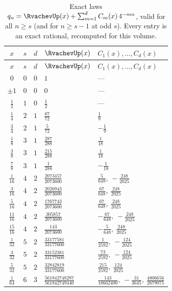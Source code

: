\documentclass[11pt,oneside]{article}
\theoremstyle{plain}
\theoremstyle{definition}
\theoremstyle{remark}
\newcommand{\upn}[1]{\RvachevUp_{#1}}
\newcommand{\Cr}[2]{C_{#1}\!\left(#2\right)}                %
\newcommand{\qn}[1]{q_{#1}}                                 %
\begin{document}
\begin{center}
\small
\begin{longtable}{@{}c c c l l@{}}
\caption{Exact laws $\qn{n}=\RvachevUp(x)+\sum_{m=1}^{d}\Cr{m}{x}4^{-mn}$, valid for all $n\ge s$ (and for $n\ge s-1$ at odd $s$).  Every entry is an exact rational, recomputed for this volume.}
\label{due:tab:exr-laws}\\
\toprule
$x$ & $s$ & $d$ & $\RvachevUp(x)$ & $\Cr{1}{x},\ldots,\Cr{d}{x}$\\
\midrule
\endfirsthead
\toprule
$x$ & $s$ & $d$ & $\RvachevUp(x)$ & $\Cr{1}{x},\ldots,\Cr{d}{x}$\\
\midrule
\endhead
$0$ & $0$ & $0$ & $1$ & ---\\
$\pm1$ & $0$ & $0$ & $0$ & ---\\
$\tfrac12$ & $1$ & $0$ & $\tfrac12$ & ---\\
$\tfrac14$ & $2$ & $1$ & $\tfrac{67}{72}$ & $\tfrac19$\\
$\tfrac34$ & $2$ & $1$ & $\tfrac5{72}$ & $-\tfrac19$\\
$\tfrac18$ & $3$ & $1$ & $\tfrac{287}{288}$ & $\tfrac1{18}$\\
$\tfrac38$ & $3$ & $1$ & $\tfrac{215}{288}$ & $\tfrac1{18}$\\
$\tfrac78$ & $3$ & $1$ & $\tfrac1{288}$ & $-\tfrac1{18}$\\
$\tfrac1{16}$ & $4$ & $2$ & $\tfrac{2073457}{2073600}$ & $\tfrac5{648},\ -\tfrac{248}{2025}$\\
$\tfrac3{16}$ & $4$ & $2$ & $\tfrac{2026943}{2073600}$ & $\tfrac{67}{648},\ \tfrac{248}{2025}$\\
$\tfrac5{16}$ & $4$ & $2$ & $\tfrac{1767743}{2073600}$ & $\tfrac{67}{648},\ \tfrac{248}{2025}$\\
$\tfrac{11}{16}$ & $4$ & $2$ & $\tfrac{305857}{2073600}$ & $-\tfrac{67}{648},\ -\tfrac{248}{2025}$\\
$\tfrac{15}{16}$ & $4$ & $2$ & $\tfrac{143}{2073600}$ & $-\tfrac5{648},\ \tfrac{248}{2025}$\\
$\tfrac1{32}$ & $5$ & $2$ & $\tfrac{33177581}{33177600}$ & $\tfrac1{2592},\ -\tfrac{124}{2025}$\\
$\tfrac3{32}$ & $5$ & $2$ & $\tfrac{33152381}{33177600}$ & $\tfrac{73}{2592},\ -\tfrac{124}{2025}$\\
$\tfrac5{32}$ & $5$ & $2$ & $\tfrac{32842819}{33177600}$ & $\tfrac{215}{2592},\ \tfrac{124}{2025}$\\
$\tfrac1{64}$ & $6$ & $3$ & $\tfrac{561842748287}{561842749440}$ & $\tfrac{143}{18662400},\ -\tfrac{31}{3645},\ \tfrac{4806656}{2679075}$\\

\end{longtable}
\end{center}
\end{document}
